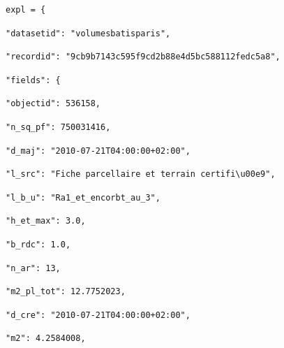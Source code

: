 \documentclass[
  11pt,
  french,
]{article}
\begin{document}
\begin{tcolorbox}[title= Chargement du jeu de données sous un format hiérarchisé dans Python ,colback=boitecode]
\begin{lstlisting}[style=code]
expl = {\end{lstlisting}
\begin{lstlisting}[style=code]
        "datasetid": "volumesbatisparis",\end{lstlisting}
\begin{lstlisting}[style=code]
        "recordid": "9cb9b7143c595f9cd2b88e4d5bc588112fedc5a8",\end{lstlisting}
\begin{lstlisting}[style=code]
        "fields": {\end{lstlisting}
\begin{lstlisting}[style=code]
            "objectid": 536158,\end{lstlisting}
\begin{lstlisting}[style=code]
            "n_sq_pf": 750031416,\end{lstlisting}
\begin{lstlisting}[style=code]
            "d_maj": "2010-07-21T04:00:00+02:00",\end{lstlisting}
\begin{lstlisting}[style=code]
            "l_src": "Fiche parcellaire et terrain certifi\u00e9",\end{lstlisting}
\begin{lstlisting}[style=code]
            "l_b_u": "Ra1_et_encorbt_au_3",\end{lstlisting}
\begin{lstlisting}[style=code]
            "h_et_max": 3.0,\end{lstlisting}
\begin{lstlisting}[style=code]
            "b_rdc": 1.0,\end{lstlisting}
\begin{lstlisting}[style=code]
            "n_ar": 13,\end{lstlisting}
\begin{lstlisting}[style=code]
            "m2_pl_tot": 12.7752023,\end{lstlisting}
\begin{lstlisting}[style=code]
            "d_cre": "2010-07-21T04:00:00+02:00",\end{lstlisting}
\begin{lstlisting}[style=code]
            "m2": 4.2584008,\end{lstlisting}

\end{tcolorbox}
\end{document}
